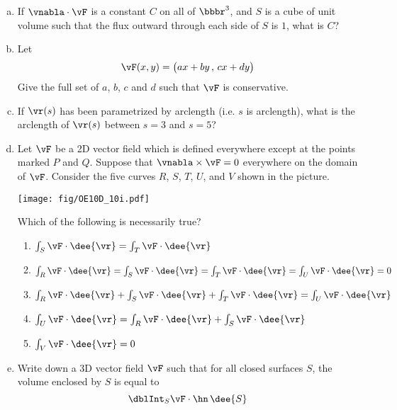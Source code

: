 \begin{question}[M317 2010D]
\begin{enumerate}[(a)]
\item 
If $\vnabla\cdot\vF$ is a constant $C$ on all of $\bbbr^3$, and 
$S$ is a cube of unit volume such that the flux outward through each 
side of $S$ is $1$, what is $C$?

\item
Let
\begin{equation*}
\vF(x, y) = \big(ax + by\,,\, cx + dy\big)
\end{equation*}
Give the full set of $a$, $b$, $c$ and $d$ such that $\vF$ is conservative.

\item 
If $\vr(s)$ has been parametrized by arclength (i.e. $s$ is arclength), 
what is the arclength of $\vr(s)$ between $s = 3$ and $s = 5$?

\item 
Let $\vF$ be a 2D vector field which is defined everywhere except at 
the points marked $P$ and $Q$. Suppose that $\vnabla\times\vF = 0$ 
everywhere on the domain of $\vF$. Consider
the five curves $R$, $S$, $T$, $U$, and $V$ shown in the picture. 

  \begin{center}
       \texttt{[image: fig/OE10D\_10i.pdf]}
  \end{center}

Which of the following is necessarily true?
\begin{enumerate}[(1)]
\item $\int_S \vF\cdot\dee{\vr} = \int_T \vF\cdot\dee{\vr}$

\item $\int_R \vF\cdot\dee{\vr} = \int_S \vF\cdot\dee{\vr} 
 = \int_T \vF\cdot\dee{\vr} = \int_U \vF\cdot\dee{\vr} = 0$

\item $\int_R \vF\cdot\dee{\vr} + \int_S \vF\cdot\dee{\vr} 
       + \int_T \vF\cdot\dee{\vr} = \int_U \vF\cdot\dee{\vr}$

\item $\int_U \vF\cdot\dee{\vr} = \int_R \vF\cdot\dee{\vr} 
   + \int_S \vF\cdot\dee{\vr}$

\item $\int_V \vF\cdot\dee{\vr} = 0$
\end{enumerate}

\item 
Write down a 3D vector field $\vF$ such that for all closed surfaces $S$, 
the volume enclosed by $S$ is equal to
\begin{equation*}
\dblInt_S \vF \cdot \hn\,\dee{S}
\end{equation*}


\end{enumerate}
\end{question}
